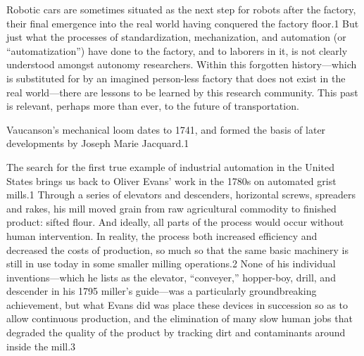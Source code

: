 Robotic cars are sometimes situated as
the next step for robots after the factory, their final emergence into
the real world having conquered the factory floor.1 But just what the
processes of standardization, mechanization, and automation (or
“automatization”) have done to the factory, and to laborers in it, is
not clearly understood amongst autonomy researchers. Within this
forgotten history—which is substituted for by an imagined person-less
factory that does not exist in the real world—there are lessons to be
learned by this research community. This past is relevant, perhaps
more than ever, to the future of transportation.

 Vaucanson's mechanical loom dates to 1741, and formed the basis of
 later developments by Joseph Marie Jacquard.1

The search for the first true example of industrial automation in the
United States brings us back to Oliver Evans' work in the 1780s on
automated grist mills.1 Through a series of elevators and descenders,
horizontal screws, spreaders and rakes, his mill moved grain from raw
agricultural commodity to finished product: sifted flour. And ideally,
all parts of the process would occur without human intervention. In
reality, the process both increased efficiency and decreased the costs
of production, so much so that the same basic machinery is still in
use today in some smaller milling operations.2 None of his individual
inventions—which he lists as the elevator, “conveyer,” hopper-boy,
drill, and descender in his 1795 miller's guide—was a particularly
groundbreaking achievement, but what Evans did was place these devices
in succession so as to allow continuous production, and the
elimination of many slow human jobs that degraded the quality of the
product by tracking dirt and contaminants around inside the mill.3 


